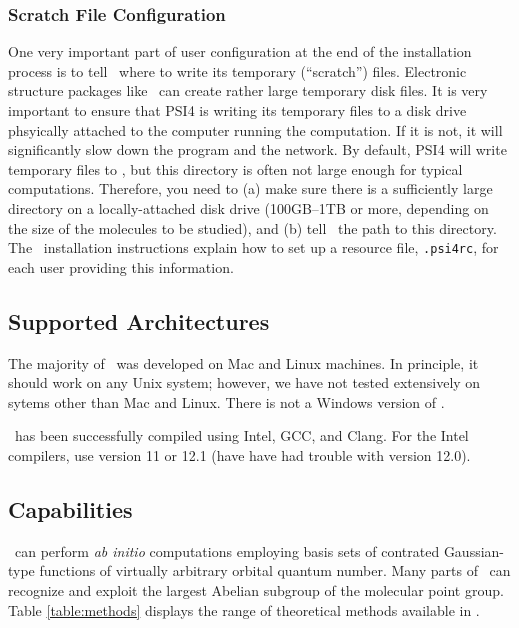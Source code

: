 \subsubsection{Scratch File Configuration}
One very important part of user configuration at the end of the
installation process is to tell \PSIfour\ where to write its temporary
(``scratch'') files.  Electronic structure packages like \PSIfour\ can
create rather large temporary disk files.  It is very important to 
ensure that PSI4 is writing its temporary files to a disk drive
phsyically attached to the computer running the computation.  If it
is not, it will significantly slow down the program and the network.
By default, PSI4 will write temporary files to , but this
directory is often not large enough for typical computations.  Therefore,
you need to (a) make sure there is a sufficiently large directory on a
locally-attached disk drive (100GB--1TB or more, depending on the size of
the molecules to be studied), and (b) tell \PSIfour\ the path to this
directory.  The \PSIfour\ installation instructions explain how to set up a
resource file, {\tt .psi4rc}, for each user providing this information.


\subsection{Supported Architectures}
The majority of \PSIfour\ was developed on Mac and Linux machines.  In
principle, it should work on any Unix system; however, we have not tested
extensively on sytems other than Mac and Linux.  There is not a Windows
version of \PSIfour.

\PSIfour\ has been successfully compiled using Intel, GCC, and Clang.
For the Intel compilers, use version 11 or
12.1 (have have had trouble with version 12.0).  


\subsection{Capabilities}

\PSIfour\ can perform {\em ab initio} computations employing basis
sets of contrated Gaussian-type functions of virtually arbitrary
orbital quantum number.  Many parts of \PSIfour\ can recognize and
exploit the largest Abelian subgroup of the molecular point group.
Table \ref{table:methods} displays the range of theoretical methods
available in \PSIfour.

